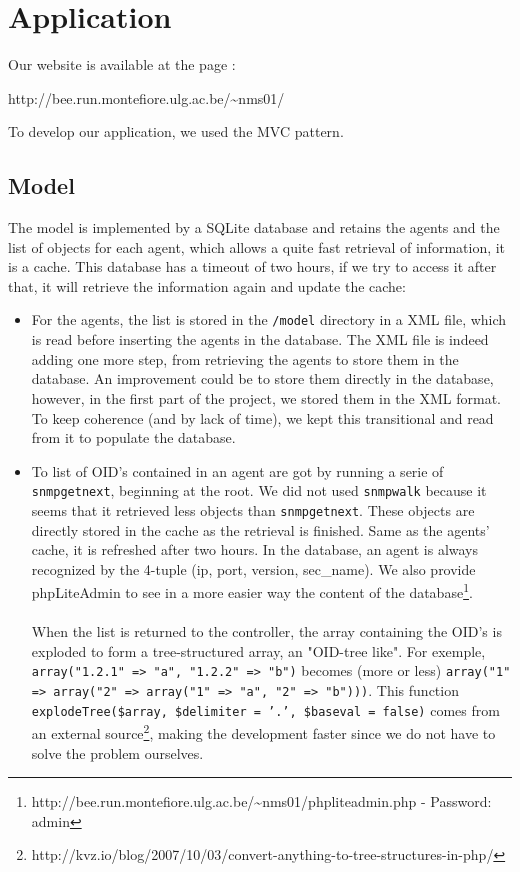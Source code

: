 \documentclass[a4paper,titlepage]{article}
\begin{document}
\section{Application}
Our website is available at the page : 
\begin{center}
	http://bee.run.montefiore.ulg.ac.be/\textasciitilde nms01/
\end{center}
To develop our application, we used the MVC pattern.

\subsection{Model}

The model is implemented by a SQLite database and retains the agents and the list of objects for each agent, which allows a quite fast retrieval of information, it is a cache. This database has a timeout of two hours, if we try to access it after that, it will retrieve the information again and update the cache:
\begin{itemize}
	\item For the agents, the list is stored in the \texttt{/model} directory in a XML file, which is read before inserting the agents in the database. The XML file is indeed adding one more step, from retrieving the agents to store them in the database. An improvement could be to store them directly in the database, however, in the first part of the project, we stored them in the XML format. To keep coherence (and by lack of time), we kept this transitional and read from it to populate the database.

	\item To list of OID's contained in an agent are got by running a serie of \texttt{snmpgetnext}, beginning at the root. We did not used \texttt{snmpwalk} because it seems that it retrieved less objects than \texttt{snmpgetnext}. These objects are directly stored in the cache as the retrieval is finished. Same as the agents' cache, it is refreshed after two hours. In the database, an agent is always recognized by the 4-tuple (ip, port, version, sec\_name). We also provide phpLiteAdmin to see in a more easier way the content of the database\footnote{http://bee.run.montefiore.ulg.ac.be/\textasciitilde nms01/phpliteadmin.php - Password: admin}.
	\paragraph{}
	When the list is returned to the controller, the array containing the OID's is exploded to form a tree-structured array, an "OID-tree like". For exemple, \texttt{array("1.2.1" => "a", "1.2.2" => "b")} becomes (more or less) \texttt{array("1" => array("2" => array("1" => "a", "2" => "b")))}. This function \texttt{explodeTree(\$array, \$delimiter = '.', \$baseval = false)} comes from an external source\footnote{http://kvz.io/blog/2007/10/03/convert-anything-to-tree-structures-in-php/}, making the development faster since we do not have to solve the problem ourselves.
\end{itemize}
\end{document}

